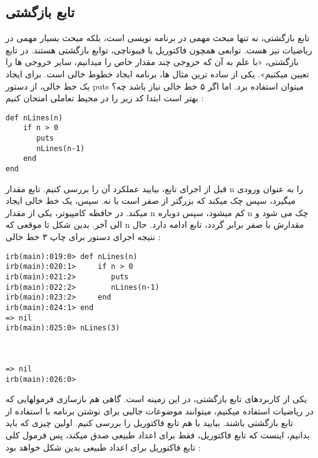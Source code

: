 \documentclass[11pt]{article}
\begin{document}
\subsection{تابع بازگشتی}
تابع بازگشتی، نه تنها مبحث مهمی در برنامه نویسی است، بلکه مبحث بسیار مهمی در ریاضیات نیز هست. توابعی همچون فاکتوریل یا فیبوناچی، توابع بازگشتی هستند. در تابع بازگشتی، «با علم به آن که خروجی چند مقدار خاص را میدانیم، سایر خروجی ها را تعیین میکنیم». یکی از ساده ترین مثال ها، برنامه ایجاد خطوط خالی است. برای ایجاد یک خط خالی، از دستور puts میتوان استفاده برد. اما اگر ۵ خط خالی نیاز باشد چه؟ بهتر است ابتدا کد زیر را در محیط تعاملی امتحان کنیم :
\begin{latin}
\begin{verbatim}
def nLines(n)
    if n > 0
       puts
       nLines(n-1)
    end
end
\end{verbatim}
\end{latin}
قبل از اجرای تابع، بیایید عملکرد آن را بررسی کنیم. تابع مقدار n را به عنوان ورودی میگیرد، سپس چک میکند که بزرگتر از صفر است یا نه. سپس، یک خط خالی ایجاد میکند. در حافظه کامپیوتر، یکی از مقدار n کم میشود، سپس دوباره n چک می شود و الی آخر. بدین شکل تا موقعی که n مقدارش با صفر برابر گردد، تابع ادامه دارد. حال نتیجه اجرای دستور برای چاپ ۳ خط خالی :
\begin{latin}
\begin{verbatim}
irb(main):019:0> def nLines(n)
irb(main):020:1>     if n > 0
irb(main):021:2>        puts
irb(main):022:2>        nLines(n-1)
irb(main):023:2>     end
irb(main):024:1> end
=> nil
irb(main):025:0> nLines(3)



=> nil
irb(main):026:0>
\end{verbatim}
\end{latin}
یکی از کاربردهای تابع بازگشتی، در این زمینه است. گاهی هم بازسازی فرمولهایی که در ریاضیات استفاده میکنیم، میتوانند موضوعات جالبی برای نوشتن برنامه با استفاده از تابع بازگشتی باشند. بیایید با هم تابع فاکتوریل را بررسی کنیم. اولین چیزی که باید بدانیم، اینست که تابع فاکتوریل، فقط برای اعداد طبیعی صدق میکند، پس فرمول کلی تابع فاکتوریل برای اعداد طبیعی بدین شکل خواهد بود :
\end{document}
